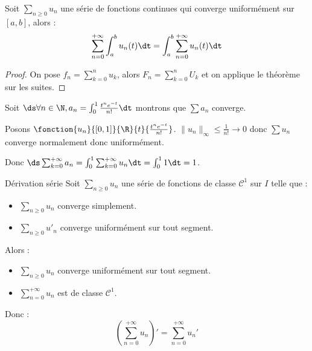 \begin{corollaire}{}{}
    Soit $\sum_{n \geqslant 0} u_n$ une série de fonctions continues qui converge uniformément sur 
    $[a, b]$, alors :
    \[\sum_{n = 0}^{+ \infty} \int_{a}^{b} u_n(t) \dt = \int_{a}^{b} \sum_{n = 0}^{+ \infty} u_n(t) \dt\]
\end{corollaire}

\begin{proof}
    On pose $\displaystyle f_n = \sum_{k = 0}^n u_k$, alors $\displaystyle F_n = \sum_{k = 0 }^{n } U_k$ et on applique le 
    théorème sur les suites. 
\end{proof}

\begin{exemple}
    Soit $\ds \forall n \in \N, a_n = \int_0^1 \frac{t^ne^{-t}}{n!} \dt$ montrons que $\sum a_n$ converge.

    Posons $\fonction{u_n}{[0,1]}{\R}{t}{\frac{t^ne^{-t}}{n!}}$. $\|u_n\|_{\infty} \leqslant \frac 1 {n!} \to 0$ donc $\sum u_n$ converge normalement donc uniformément.

    Donc $\ds \sum_{k=0}^{+\infty} a_n = \int_0^1 \sum_{k=0}^{+\infty} u_n \dt = \int_0^1 1 \dt = 1$. 
\end{exemple}

\begin{theoreme}{Dérivation série}{}
    Soit $\sum_{n \geqslant 0} u_n$ une série de fonctions de classe $\mathscr{C}^1$ sur $I$ telle que :
    \begin{itemize}
        \item $\sum_{n \geqslant 0} u_n$ converge simplement.
        \item $\sum_{n \geqslant 0} u'_n$ converge uniformément sur tout segment.
    \end{itemize}
    Alors : 
    \begin{itemize}
        \item $\sum_{n \geqslant 0} u_n$ converge uniformément sur tout segment.
        \item $\displaystyle \sum_{n = 0 }^{+ \infty } u_n$ est de classe $\mathscr C^1$.
    \end{itemize}
    Donc : 
    \[\left(\sum_{n = 0}^{+ \infty} u_n\right)' = \sum_{n = 0 }^{+ \infty } u_n'\]
\end{theoreme}

